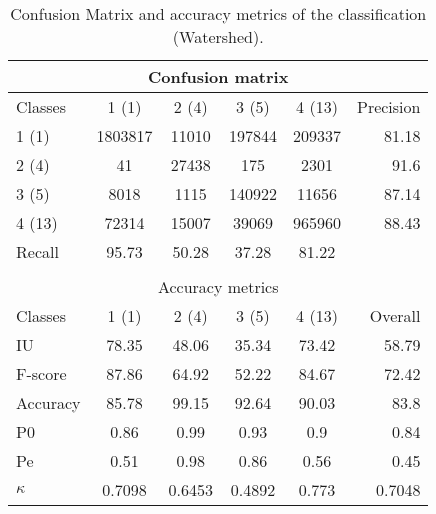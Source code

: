 \begin{table}[H]
\begin{center}
\footnotesize
\begin{tabular}{|l|c|c|c|c|r|}
\hline
\multicolumn{6}{|c|}{Confusion matrix} \\
\hline
 Classes & 1 (1) & 2 (4) & 3 (5) & 4 (13) & Precision \\
\hline
1 (1) & 1803817 & 11010 & 197844 & 209337 & 81.18 \\
\hline
2 (4) & 41 & 27438 & 175 & 2301 & 91.6 \\
\hline
3 (5) & 8018 & 1115 & 140922 & 11656 & 87.14 \\
\hline
4 (13) & 72314 & 15007 & 39069 & 965960 & 88.43 \\
\hline
Recall & 95.73 & 50.28 & 37.28 & 81.22 &  \\
\hline
\multicolumn{6}{c}{ } \\
\hline
\multicolumn{6}{|c|}{Accuracy metrics} \\
\hline
 Classes & 1 (1) & 2 (4) & 3 (5) & 4 (13) & Overall \\
\hline
IU & 78.35 & 48.06 & 35.34 & 73.42 & 58.79 \\
\hline
F-score & 87.86 & 64.92 & 52.22 & 84.67 & 72.42 \\
\hline
Accuracy & 85.78 & 99.15 & 92.64 & 90.03 & 83.8 \\
\hline
P0 & 0.86 & 0.99 & 0.93 & 0.9 & 0.84 \\
\hline
Pe & 0.51 & 0.98 & 0.86 & 0.56 & 0.45 \\
\hline
$\kappa$ & 0.7098 & 0.6453 & 0.4892 & 0.773 & 0.7048 \\
\hline
\end{tabular}
\caption{Confusion Matrix and accuracy metrics of the classification (Watershed).}
\label{table:}
\end{center}
\end{table}

